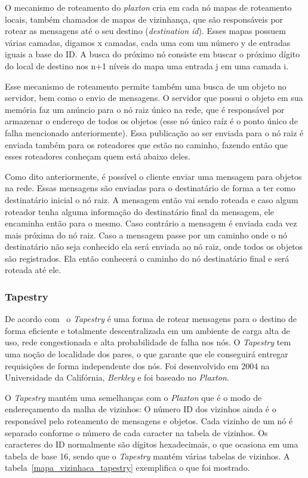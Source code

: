 O mecanismo de roteamento do \emph{plaxton} cria em cada nó mapas de roteamento locais, também chamados de mapas de vizinhança, que são responsáveis por rotear as mensagens até o seu destino (\emph{destination id}). Esses mapas possuem várias camadas, digamos x camadas, cada uma com um número y de entradas iguais a base do ID. A busca do próximo nó consiste em buscar o próximo dígito do local de destino nos n+1 níveis do mapa uma entrada j em uma camada i.

Esse mecanismo de roteamento permite também uma busca de um objeto no servidor, bem como o envio de mensagens. O servidor que possui o objeto em sua memória faz um anúncio para o nó raiz único na rede, que é responsável por armazenar o endereço de todos os objetos (esse nó único raíz é o ponto único de falha mencionado anteriormente). Essa publicação ao ser enviada para o nó raiz é enviada também para os roteadores que estão no caminho, fazendo então que esses roteadores conheçam quem está abaixo deles.

Como dito anteriormente, é possível o cliente enviar uma mensagem para objetos na rede. Essas mensagens são enviadas para o destinatário de forma a ter como destinatário inicial o nó raiz. A mensagem então vai sendo roteada e caso algum roteador tenha alguma informação do destinatário final da mensagem, ele encaminha então para o mesmo. Caso contrário a mensagem é enviada cada vez mais próxima do nó raiz. Caso a mensagem passe por um caminho onde o nó destinatário não seja conhecido ela será enviada ao nó raiz, onde todos os objetos são registrados. Ela então conhecerá o caminho do nó destinatário final e será roteada até ele.

\subsubsection{Tapestry}

De acordo com~\cite{rowstron01} o \emph{Tapestry} é uma forma de rotear mensagens para o destino de forma eficiente e totalmente descentralizada em um ambiente de carga alta de uso, rede congestionada e alta probabilidade de falha nos nós. O \emph{Tapestry} tem uma noção de localidade dos pares, o que garante que ele conseguirá entregar requisições de forma independente dos nós. Foi desenvolvido em 2004 na Universidade da Califórnia, \emph{Berkley} e foi baseado no \emph{Plaxton}.

O \emph{Tapestry} mantém uma semelhanças com o \emph{Plaxton} que é o modo de endereçamento da malha de vizinhos: O número ID dos vizinhos ainda é o responsável pelo roteamento de mensagens e objetos. Cada vizinho de um nó é separado conforme o número de cada caracter na tabela de vizinhos. Os caracteres do ID normalmente são dígitos hexadecimais, o que ocasiona em uma tabela de base 16, sendo que o \emph{Tapestry} mantém várias tabelas de vizinhos. A tabela~\ref{mapa_vizinhaca_tapestry} exemplifica o que foi mostrado.

